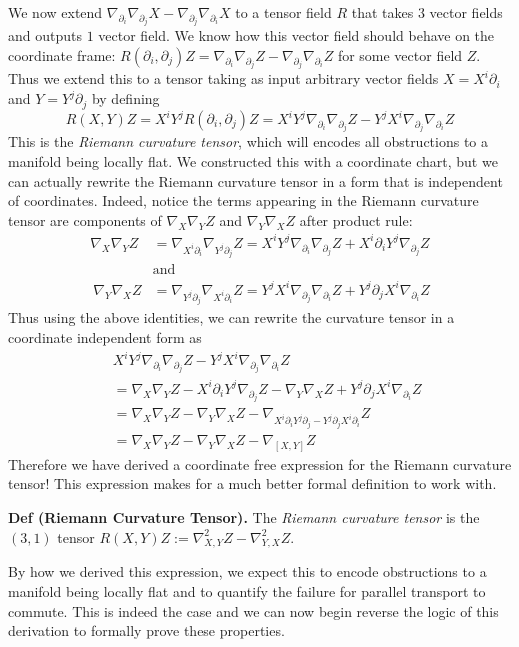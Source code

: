 \documentclass[
]{article}
\begin{document}
We now extend
\(\nabla_{\partial_{i}}\nabla_{\partial_{j}} X - \nabla_{\partial_{j}}\nabla_{\partial_{i}} X\)
to a tensor field \(R\) that takes \(3\) vector fields and outputs \(1\)
vector field. We know how this vector field should behave on the
coordinate frame:
\(R(\partial_{i}, \partial_{j})Z = \nabla_{\partial_{i}}\nabla_{\partial_{j}} Z - \nabla_{\partial_{j}}\nabla_{\partial_{i}} Z\)
for some vector field \(Z\). Thus we extend this to a tensor taking as
input arbitrary vector fields \(X = X^i\partial_i\) and
\(Y = Y^j\partial_j\) by defining \[
    R(X, Y)Z = X^iY^jR(\partial_i, \partial_j)Z 
    = X^iY^j\nabla_{\partial_{i}}\nabla_{\partial_{j}} Z - Y^jX^i\nabla_{\partial_{j}}\nabla_{\partial_{i}} Z
\] This is the \emph{Riemann curvature tensor}, which will encodes all
obstructions to a manifold being locally flat. We constructed this with
a coordinate chart, but we can actually rewrite the Riemann curvature
tensor in a form that is independent of coordinates. Indeed, notice the
terms appearing in the Riemann curvature tensor are components of
\(\nabla_X\nabla_Y Z\) and \(\nabla_Y\nabla_X Z\) after product rule:
\begin{align}
    \nabla_X\nabla_Y Z 
    &= \nabla_{X^i\partial_i}\nabla_{Y^j\partial_j} Z 
    = X^iY^j\nabla_{\partial_i}\nabla_{\partial_j} Z + X^i\partial_iY^j\nabla_{\partial_j}Z\\\
    &\text{and}\\\
    \nabla_Y\nabla_X Z 
    &= \nabla_{Y^j\partial_j}\nabla_{X^i\partial_i} Z 
    = Y^jX^i\nabla_{\partial_j}\nabla_{\partial_i} Z + Y^j\partial_jX^i\nabla_{\partial_i}Z
\end{align} Thus using the above identities, we can rewrite the
curvature tensor in a coordinate independent form as \begin{align}
        & X^iY^j\nabla_{\partial_{i}}\nabla_{\partial_{j}} Z - Y^jX^i\nabla_{\partial_{j}}\nabla_{\partial_{i}} Z\\\
        &= \nabla_X\nabla_Y Z - X^i\partial_iY^j\nabla_{\partial_j}Z 
        - \nabla_Y\nabla_X Z 
        + Y^j\partial_jX^i\nabla_{\partial_i}Z\\\
        &=  \nabla_X\nabla_Y Z - \nabla_Y\nabla_X Z - \nabla_{X^i\partial_iY^j \partial_j - Y^j\partial_jX^i \partial_i}Z\\\
        &= \nabla_X\nabla_Y Z - \nabla_Y\nabla_X Z - \nabla_{[X,Y]}Z
    \end{align} Therefore we have derived a coordinate free expression
for the Riemann curvature tensor! This expression makes for a much
better formal definition to work with.

\textbf{Def (Riemann Curvature Tensor).} The \emph{Riemann curvature
tensor} is the \((3,1)\) tensor
\(R(X,Y)Z := \nabla^2_{X,Y} Z - \nabla^2_{Y,X} Z\).

By how we derived this expression, we expect this to encode obstructions
to a manifold being locally flat and to quantify the failure for
parallel transport to commute. This is indeed the case and we can now
begin reverse the logic of this derivation to formally prove these
properties.
\end{document}
